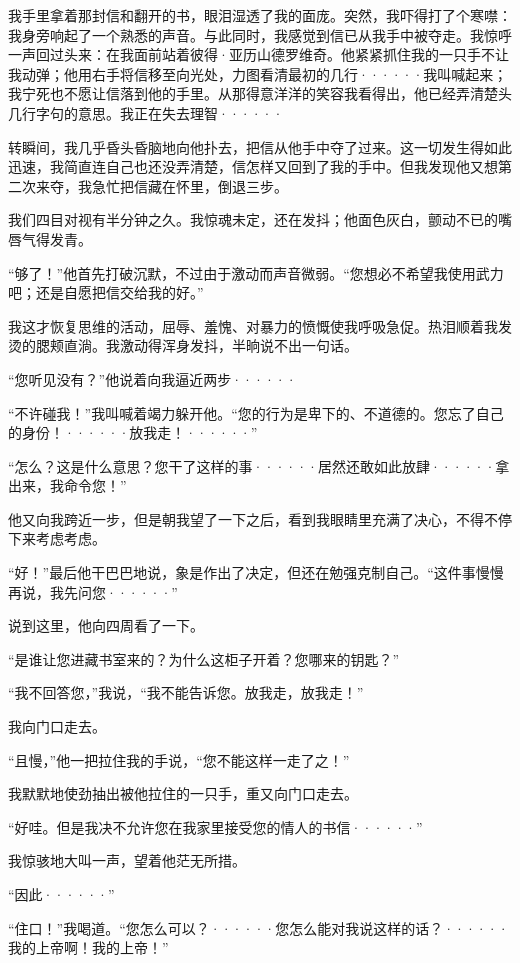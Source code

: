 \documentclass[12pt, UTF8]{ctexbook}
\begin{document}
\par 我手里拿着那封信和翻开的书，眼泪湿透了我的面庞。突然，我吓得打了个寒噤：我身旁响起了一个熟悉的声音。与此同时，我感觉到信已从我手中被夺走。我惊呼一声回过头来：在我面前站着彼得·亚历山德罗维奇。他紧紧抓住我的一只手不让我动弹；他用右手将信移至向光处，力图看清最初的几行······我叫喊起来；我宁死也不愿让信落到他的手里。从那得意洋洋的笑容我看得出，他已经弄清楚头几行字句的意思。我正在失去理智······
\par 转瞬间，我几乎昏头昏脑地向他扑去，把信从他手中夺了过来。这一切发生得如此迅速，我简直连自己也还没弄清楚，信怎样又回到了我的手中。但我发现他又想第二次来夺，我急忙把信藏在怀里，倒退三步。
\par 我们四目对视有半分钟之久。我惊魂未定，还在发抖；他面色灰白，颤动不已的嘴唇气得发青。
\par “够了！”他首先打破沉默，不过由于激动而声音微弱。“您想必不希望我使用武力吧；还是自愿把信交给我的好。”
\par 我这才恢复思维的活动，屈辱、羞愧、对暴力的愤慨使我呼吸急促。热泪顺着我发烫的腮颊直淌。我激动得浑身发抖，半晌说不出一句话。
\par “您听见没有？”他说着向我逼近两步······
\par “不许碰我！”我叫喊着竭力躲开他。“您的行为是卑下的、不道德的。您忘了自己的身份！······放我走！······”
\par “怎么？这是什么意思？您干了这样的事······居然还敢如此放肆······拿出来，我命令您！”
\par 他又向我跨近一步，但是朝我望了一下之后，看到我眼睛里充满了决心，不得不停下来考虑考虑。
\par “好！”最后他干巴巴地说，象是作出了决定，但还在勉强克制自己。“这件事慢慢再说，我先问您······”
\par 说到这里，他向四周看了一下。
\par “是谁让您进藏书室来的？为什么这柜子开着？您哪来的钥匙？”
\par “我不回答您，”我说，“我不能告诉您。放我走，放我走！”
\par 我向门口走去。
\par “且慢，”他一把拉住我的手说，“您不能这样一走了之！”
\par 我默默地使劲抽出被他拉住的一只手，重又向门口走去。
\par “好哇。但是我决不允许您在我家里接受您的情人的书信······”
\par 我惊骇地大叫一声，望着他茫无所措。
\par “因此······”
\par “住口！”我喝道。“您怎么可以？······您怎么能对我说这样的话？······我的上帝啊！我的上帝！”
\end{document}
